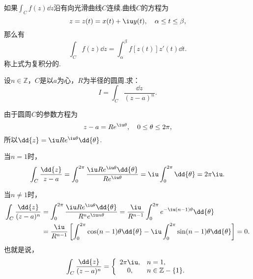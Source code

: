 \begin{corollary}
如果\(\int_C f(z) \dd{z}\)沿有向光滑曲线\(C\)连续.曲线\(C\)的方程为\begin{equation*}
z = z(t) = x(t) + \iu y(t), \quad \alpha \leq t \leq \beta,
\end{equation*}那么有\begin{equation*}
\int_C f(z) \dd{z} = \int_\alpha^\beta f[z(t)] z'(t) \dd{t}.
\end{equation*}称上式为复积分的.
\end{corollary}

\begin{example}
设\(n\in\mathbb{Z}\)，\(C\)是以\(a\)为心，\(R\)为半径的圆周.求：\begin{equation*}
I = \int_C \frac{\dd{z}}{(z-a)^n}.
\end{equation*}
\begin{solution}
由于圆周\(C\)的参数方程为\begin{equation*}
z-a=Re^{\iu\theta}, \quad 0 \leq \theta \leq 2\pi,
\end{equation*}所以\(\dd{z}=\iu R e^{\iu\theta} \dd{\theta}\).

当\(n=1\)时，\begin{equation*}
\int_C \frac{\dd{z}}{z-a}
= \int_0^{2\pi}{\frac{\iu R e^{\iu\theta} \dd{\theta}}{R e^{\iu\theta}}}
= \iu \int_0^{2\pi}\dd{\theta}
= 2\pi\iu.
\end{equation*}

当\(n \neq 1\)时，\begin{align*}
\int_C{\frac{\dd{z}}{(z-a)^n}}
&= \int_0^{2\pi}{
	\frac{
		\iu R e^{\iu\theta} \dd{\theta}
	}{
		R^n e^{\iu n \theta}
	}
}
= \frac{\iu}{R^{n-1}} \int_0^{2\pi}{e^{-\iu(n-1)\theta}\dd{\theta}} \\
&= \frac{\iu}{R^{n-1}} \left[
	\int_0^{2\pi}{\cos(n-1)\theta\dd{\theta}}
	-\iu \int_0^{2\pi}{\sin(n-1)\theta\dd{\theta}}
	\right]
= 0.
\end{align*}
也就是说，\begin{equation}\label{equation:解析函数的积分表示.重要积分1}
\int_C \frac{\dd{z}}{(z-a)^n} = \left\{ \begin{array}{cl}
2\pi\iu, & n=1, \\
0, & n\in\mathbb{Z}-\{1\}.
\end{array} \right.
\end{equation}
\end{solution}
\end{example}

